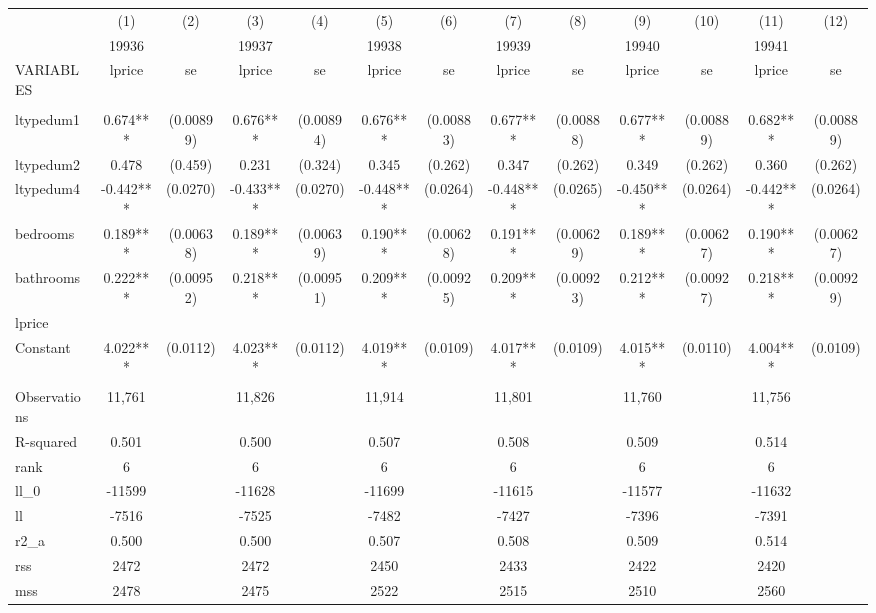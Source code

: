 \documentclass[]{article}
\begin{document}
\begin{tabular}{lcccccccccccc} \hline
 & (1) & (2) & (3) & (4) & (5) & (6) & (7) & (8) & (9) & (10) & (11) & (12) \\
 & 19936 &  & 19937 &  & 19938 &  & 19939 &  & 19940 &  & 19941 &  \\
VARIABLES & lprice & se & lprice & se & lprice & se & lprice & se & lprice & se & lprice & se \\ \hline
 &  &  &  &  &  &  &  &  &  &  &  &  \\
ltypedum1 & 0.674*** & (0.00899) & 0.676*** & (0.00894) & 0.676*** & (0.00883) & 0.677*** & (0.00888) & 0.677*** & (0.00889) & 0.682*** & (0.00889) \\
ltypedum2 & 0.478 & (0.459) & 0.231 & (0.324) & 0.345 & (0.262) & 0.347 & (0.262) & 0.349 & (0.262) & 0.360 & (0.262) \\
ltypedum4 & -0.442*** & (0.0270) & -0.433*** & (0.0270) & -0.448*** & (0.0264) & -0.448*** & (0.0265) & -0.450*** & (0.0264) & -0.442*** & (0.0264) \\
bedrooms & 0.189*** & (0.00638) & 0.189*** & (0.00639) & 0.190*** & (0.00628) & 0.191*** & (0.00629) & 0.189*** & (0.00627) & 0.190*** & (0.00627) \\
bathrooms & 0.222*** & (0.00952) & 0.218*** & (0.00951) & 0.209*** & (0.00925) & 0.209*** & (0.00923) & 0.212*** & (0.00927) & 0.218*** & (0.00929) \\
lprice &  &  &  &  &  &  &  &  &  &  &  &  \\
Constant & 4.022*** & (0.0112) & 4.023*** & (0.0112) & 4.019*** & (0.0109) & 4.017*** & (0.0109) & 4.015*** & (0.0110) & 4.004*** & (0.0109) \\
 &  &  &  &  &  &  &  &  &  &  &  &  \\
Observations & 11,761 &  & 11,826 &  & 11,914 &  & 11,801 &  & 11,760 &  & 11,756 &  \\
R-squared & 0.501 &  & 0.500 &  & 0.507 &  & 0.508 &  & 0.509 &  & 0.514 &  \\
rank & 6 &  & 6 &  & 6 &  & 6 &  & 6 &  & 6 &  \\
ll\_0 & -11599 &  & -11628 &  & -11699 &  & -11615 &  & -11577 &  & -11632 &  \\
ll & -7516 &  & -7525 &  & -7482 &  & -7427 &  & -7396 &  & -7391 &  \\
r2\_a & 0.500 &  & 0.500 &  & 0.507 &  & 0.508 &  & 0.509 &  & 0.514 &  \\
rss & 2472 &  & 2472 &  & 2450 &  & 2433 &  & 2422 &  & 2420 &  \\
mss & 2478 &  & 2475 &  & 2522 &  & 2515 &  & 2510 &  & 2560 &  \\

\end{tabular}
\end{document}
